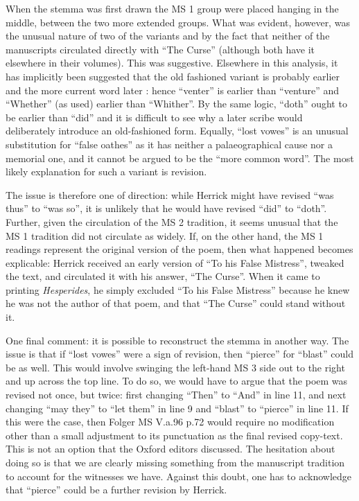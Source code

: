\begin{paper}
When the stemma was first drawn the MS 1 group were placed hanging in
the middle, between the two more extended groups. What was evident,
however, was the unusual nature of two of the variants and by the fact
that neither of the manuscripts circulated directly with ``The Curse''
(although both have it elsewhere in their volumes). This was suggestive.
Elsewhere in this analysis, it has implicitly been suggested that the
old fashioned variant is probably earlier and the more current word
later \citep[177--82]{bland_guide_2010}: hence ``venter'' is earlier than ``venture'' and
``Whether'' (as used) earlier than ``Whither''. By the same logic, ``doth''
ought to be earlier than ``did'' and it is difficult to see why a later
scribe would deliberately introduce an old-fashioned form. Equally,
``lost vowes'' is an unusual substitution for ``false oathes'' as it has
neither a palaeographical cause nor a memorial one, and it cannot be
argued to be the ``more common word''. The most likely explanation for
such a variant is revision.

The issue is therefore one of direction: while Herrick might have
revised ``was thus'' to ``was so'', it is unlikely that he would have
revised ``did'' to ``doth''. Further, given the circulation of the
MS 2 tradition, it seems unusual that the MS 1
tradition did not circulate as widely. If, on the other hand, the
MS 1 readings represent the original version of the poem, then
what happened becomes explicable: Herrick received an early version of
``To his False Mistress'', tweaked the text, and circulated it with his
answer, ``The Curse''. When it came to printing \emph{Hesperides}, he
simply excluded ``To his False Mistress'' because he knew he was not the
author of that poem, and that ``The Curse'' could stand without it.

One final comment: it is possible to reconstruct the stemma in another
way. The issue is that if ``lost vowes'' were a sign of revision, then
``pierce'' for ``blast'' could be as well. This would involve swinging the
left-hand MS 3 side out to the right and up across the top line. To do
so, we would have to argue that the poem was revised not once, but
twice: first changing ``Then'' to ``And'' in line 11, and next changing ``may
they'' to ``let them'' in line 9 and ``blast'' to ``pierce'' in line 11. If
this were the case, then Folger MS V.a.96 p.72 would require no
modification other than a small adjustment to its punctuation as the
final revised copy-text. This is not an option that the Oxford editors
discussed. The hesitation about doing so is that we are clearly missing
something from the manuscript tradition to account for the witnesses we
have. Against this doubt, one has to acknowledge that ``pierce'' could be
a further revision by Herrick.


\end{paper}
